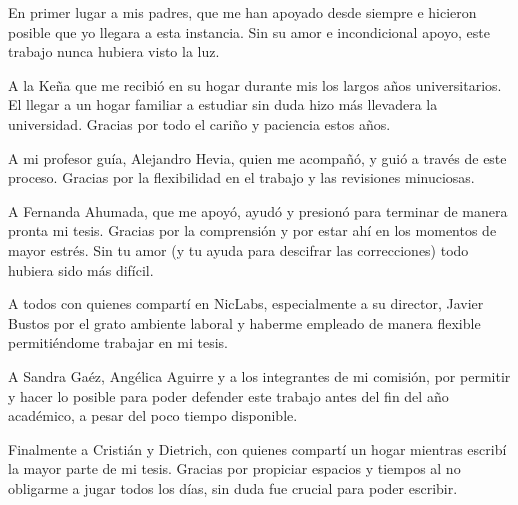 En primer lugar a mis padres, que me han apoyado desde siempre e hicieron
  posible que yo llegara a esta instancia.
Sin su amor e incondicional apoyo, este trabajo nunca hubiera visto la luz.

A la Ke\~na que me recibi\'o en su hogar durante mis los largos a\~nos
  universitarios. El llegar a un hogar familiar a estudiar sin duda hizo
  m\'as llevadera la universidad. Gracias por todo el cari\~no y paciencia
  estos a\~nos.

A mi profesor gu\'ia, Alejandro Hevia, quien me acompa\~n\'o, y gui\'o
  a trav\'es de este proceso. Gracias por la flexibilidad en el trabajo
  y las revisiones minuciosas.

A Fernanda Ahumada, que me apoy\'o, ayud\'o y presion\'o para terminar de
  manera pronta mi tesis. Gracias por la comprensi\'on y por estar ah\'i en los
  momentos de mayor estr\'es. Sin tu amor (y tu ayuda para descifrar las
  correcciones) todo hubiera sido m\'as dif\'icil.

A todos con quienes compart\'i en NicLabs, especialmente a su director, Javier
  Bustos por el grato ambiente laboral y haberme empleado de manera flexible
  permiti\'endome trabajar en mi tesis.

A Sandra Ga\'ez, Ang\'elica Aguirre y a los integrantes de mi comisi\'on, por
  permitir y hacer lo posible para poder defender este trabajo antes del fin
  del a\~no acad\'emico, a pesar del poco tiempo disponible.

Finalmente a Cristi\'an y Dietrich, con quienes compart\'i un hogar mientras
  escrib\'i la mayor parte de mi tesis. Gracias por propiciar espacios
  y tiempos al no obligarme a jugar todos los d\'ias, sin duda fue crucial
  para poder escribir.
